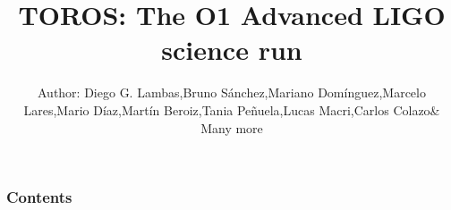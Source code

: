 \documentclass[10pt]{beamer}
\begin{document}
\title[The TOROS collaboration]
{TOROS: The O1 Advanced LIGO science run}

\author{
\begin{tabular}{r@{ }l} 
Author: Diego G. Lambas, & Bruno S\'anchez,   & Mariano Dom\'{i}nguez,  & Marcelo Lares, 
        & Mario D\'{i}az,  & Mart\'{i}n Beroiz,  & Tania Pe\~nuela, & Lucas Macri, & Carlos Colazo & \& Many more
\end{tabular}}

\frame{\titlepage}
\begin{frame}
\frametitle{Contents}
\tableofcontents%
\end{frame}
\end{document}

